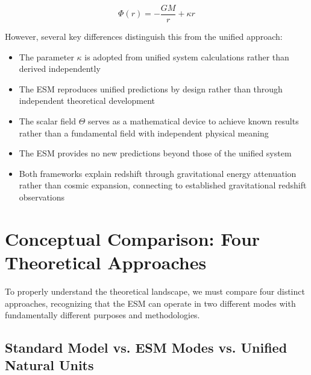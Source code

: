 	\begin{equation}
		\Phi(r) = -\frac{GM}{r} + \kappa r
	\end{equation}
	
	However, several key differences distinguish this from the unified approach:
	
	\begin{itemize}
		\item The parameter $\kappa$ is adopted from unified system calculations rather than derived independently
		\item The ESM reproduces unified predictions by design rather than through independent theoretical development
		\item The scalar field $\Theta$ serves as a mathematical device to achieve known results rather than a fundamental field with independent physical meaning
		\item The ESM provides no new predictions beyond those of the unified system
		\item Both frameworks explain redshift through gravitational energy attenuation rather than cosmic expansion, connecting to established gravitational redshift observations \cite{Adams1925,Shapiro1971}
	\end{itemize}
	
	\section{Conceptual Comparison: Four Theoretical Approaches}
	\label{sec:four_framework_comparison}
	
	To properly understand the theoretical landscape, we must compare four distinct approaches, recognizing that the ESM can operate in two different modes with fundamentally different purposes and methodologies.
	
	\subsection{Standard Model vs. ESM Modes vs. Unified Natural Units}
	\label{subsec:four_way_comparison}
	
